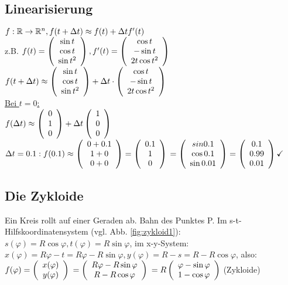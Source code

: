 \renewcommand{\ldate}{2015-10-22}

\subsection{Linearisierung}
$f:\R \rightarrow \R^n, f(t+\Dt )\approx f(t) + \Dt f'(t) $\\
z.B. $ f(t)= \vektor{\sin t\\ \cos t\\ \sin t^2}, f'(t)=\vektor{\cos t\\-\sin t\\2 t \cos t^2}$\\
$f(t+\Dt) \approx \vektor{\sin t\\ \cos t\\ \sin t^2} + \Dt \cdot \vektor{\cos t\\-\sin t\\2 t \cos t^2}$\\
\underline{Bei $t=0$:}\\
$f(\Dt) \approx \vektor{0\\1\\0} + \Dt \vektor{1\\0\\0}$\\
$\Dt=0.1: f(0.1)\approx \vektor{0+0.1\\1+0\\0+0}=\vektor{0.1\\1\\0}$
$= \vektor{sin 0.1\\ \cos 0.1\\ \sin 0.01} = \vektor{0.1\\ 0.99\\ 0.01} \checkmark $

\subsection{Die Zykloide}
\label{sec:die_zykloide}
Ein Kreis rollt auf einer Geraden ab. Bahn des Punktes P. Im s-t-Hilfskoordinatensystem (vgl. Abb. \ref{fig:zykloid1}): 
$s(\varphi) = R \cos \varphi, t(\varphi) = R \sin \varphi$, im x-y-System: 
$x(\varphi) = R \varphi - t = R\varphi - R \sin \varphi, y(\varphi)=R-s = R-R \cos \varphi$, also: \\
$f(\varphi) = \vektor{x(\varphi)\\y(\varphi)}$
$= \vektor{R\varphi - R \sin \varphi\\R-R \cos \varphi}$
$=R \vektor{\varphi - \sin \varphi\\1-\cos \varphi}$ (Zykloide)

